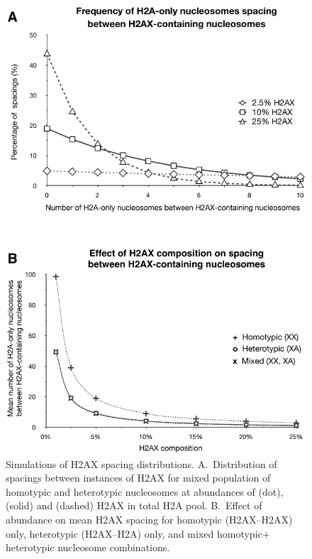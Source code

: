 \begin{figure}
\includegraphics[width=\textwidth]{Fig7}
\caption{Simulations of H2AX spacing distributions. A.~Distribution of spacings between instances of
H2AX for mixed population of homotypic and heterotypic nucleosomes at abundances of  (dot),
 (solid) and  (dashed) H2AX in total H2A pool. B.~Effect of abundance on mean H2AX spacing
for homotypic (H2AX--H2AX) only, heterotypic (H2AX--H2A) only, and mixed homotypic$+$heterotypic
nucleosome combinations.}
\label{fig:h2ax-review:H2AX-graphs}
\end{figure}

